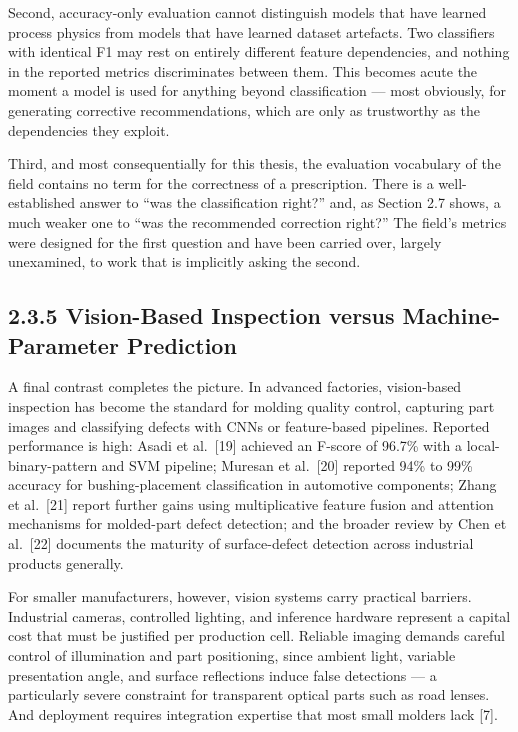 Second, accuracy-only evaluation cannot distinguish models that have learned process physics from models that have learned dataset artefacts. Two classifiers with identical F1 may rest on entirely different feature dependencies, and nothing in the reported metrics discriminates between them. This becomes acute the moment a model is used for anything beyond classification --- most obviously, for generating corrective recommendations, which are only as trustworthy as the dependencies they exploit.

Third, and most consequentially for this thesis, the evaluation vocabulary of the field contains no term for the correctness of a prescription. There is a well-established answer to ``was the classification right?'' and, as Section 2.7 shows, a much weaker one to ``was the recommended correction right?'' The field's metrics were designed for the first question and have been carried over, largely unexamined, to work that is implicitly asking the second.

\hypertarget{vision-based-inspection-versus-machine-parameter-prediction}{%
\subsection{2.3.5 Vision-Based Inspection versus Machine-Parameter Prediction}\label{vision-based-inspection-versus-machine-parameter-prediction}}

A final contrast completes the picture. In advanced factories, vision-based inspection has become the standard for molding quality control, capturing part images and classifying defects with CNNs or feature-based pipelines. Reported performance is high: Asadi et al.~{[}19{]} achieved an F-score of 96.7\% with a local-binary-pattern and SVM pipeline; Muresan et al.~{[}20{]} reported 94\% to 99\% accuracy for bushing-placement classification in automotive components; Zhang et al.~{[}21{]} report further gains using multiplicative feature fusion and attention mechanisms for molded-part defect detection; and the broader review by Chen et al.~{[}22{]} documents the maturity of surface-defect detection across industrial products generally.

For smaller manufacturers, however, vision systems carry practical barriers. Industrial cameras, controlled lighting, and inference hardware represent a capital cost that must be justified per production cell. Reliable imaging demands careful control of illumination and part positioning, since ambient light, variable presentation angle, and surface reflections induce false detections --- a particularly severe constraint for transparent optical parts such as road lenses. And deployment requires integration expertise that most small molders lack {[}7{]}.

